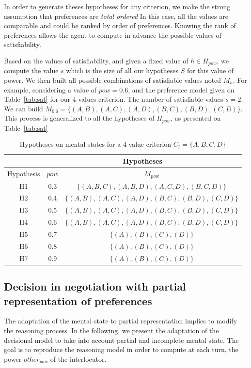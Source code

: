 \documentclass[sigconf]{aamas}  %
\begin{document}
	In order to generate theses hypotheses for any criterion, we make the strong assumption that preferences are \emph{total ordered} In this case, all the values are comparable and could be ranked by order of preferences. Knowing the rank of preferences allows the agent to compute in advance the possible values of satisfiability.
	
	Based on the values of satisfiability, and given a fixed value of $h \in H_{pow}$, we compute the value $s$ which is the size of all our hypotheses $S$ for this value of power. We then built all possible combinations of satisfiable values  noted $M_h$. For example, considering a value of $pow =0.6$, and the preference model given on Table~\ref{tab:sat} for our 4-values criterion. The number of satisfiable values $s=2$. We can build $M_{0.6} = \{(A,B), (A,C), (A,D), (B,C), (B,D), (C,D)\}$. This process is generalized to all the hypotheses of $H_{pow}$, as presented on Table~\ref{tab:sat}
	
	\begin{table}[h]
		\centering
		\caption{Hypotheses on mental states for a 4-value criterion $C_i=\{A, B, C, D\}$}
		\begin{tabular}{ |c|c|c| }
			\hline
			& \multicolumn{2}{c|}{Hypotheses}  \\
			\hline
			Hypothesis & $pow$ & $M_{pow}$ \\
			\hline
			H1&0.3&$\{ (A,B,C) , (A,B,D), (A,C,D), (B,C,D) \}$ \\
			\hline
			H2&0.4&$\{ (A,B), (A,C), (A,D), (B,C), (B,D), (C,D) \}$ \\
			\hline
			H3&0.5&$\{ (A,B), (A,C), (A,D), (B,C), (B,D), (C,D) \}$\\
			\hline
			H4&0.6&$\{ (A,B), (A,C), (A,D), (B,C), (B,D), (C,D) \}$ \\
			\hline
			H5&0.7&$\{ (A), (B), (C), (D) \}$\\
			\hline
			H6&0.8&$\{ (A), (B), (C), (D) \}$ \\
			\hline
			H7&0.9&$\{ (A), (B), (C), (D) \}$ \\
			\hline
		\end{tabular}
		
		\label{table:poss}
	\end{table}
	
	\subsection{Decision in negotiation with partial representation of preferences}
	The adaptation of the mental state to partial representation implies to modify the reasoning process. In the following, we present the adaptation of the decisional model to take into account partial and incomplete mental state. The goal is to reproduce the reasoning model in order to compute at each turn, the power $other_{pow}$ of the interlocutor. 
	
\end{document}

